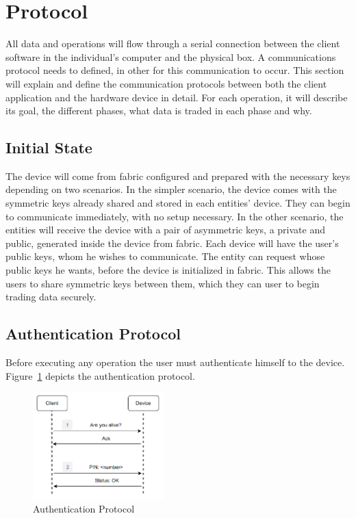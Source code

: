 \section{Protocol}\label{chap:implementation:protocol}

All data and operations will flow through a serial connection between the client software in the individual's computer and the physical box. A communications protocol needs to defined, in other for this communication to occur.
This section will explain and define the communication protocols between both the client application and the hardware device in detail. For each operation, it will describe its goal, the different phases, what data is traded in each phase and why.

\subsection{Initial State}\label{chap:implementation:protocol:initial-state}

The device will come from fabric configured and prepared with the necessary keys depending on two scenarios. In the simpler scenario, the device comes with the symmetric keys already shared and stored in each entities' device. They can begin to communicate immediately, with no setup necessary.
In the other scenario, the entities will receive the device with a pair of asymmetric keys, a private and public, generated inside the device from fabric. Each device will have the user's public keys, whom he wishes to communicate. The entity can request whose public keys he wants, before the device is initialized in fabric. This allows the users to share symmetric keys between them, which they can user to begin trading data securely.

\subsection{Authentication Protocol}\label{chap:implementation:protocol:auth}

Before executing any operation the user must authenticate himself to the device.
Figure~\ref{fig:protocol:authentication} depicts the authentication protocol.

\begin{figure}[h!]
	\centering
	\includegraphics[width=0.45\textwidth]{./Images/authentication.png}
	\caption{Authentication Protocol}
	\label{fig:protocol:authentication}
\end{figure}

